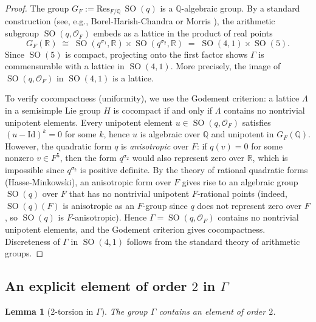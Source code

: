 \documentclass[12pt]{article}
\newtheorem{lemma}[theorem]{Lemma}
\theoremstyle{definition}
\DeclareMathOperator{\SO}{SO}
\begin{document}
\begin{proof}
The group $G_F := \mathrm{Res}_{F/\mathbb{Q}}\,\SO(q)$ is a $\mathbb{Q}$-algebraic group.
By a standard construction (see, e.g., Borel-Harish-Chandra \cite{BHC} or Morris
\cite{Morris2015}), the arithmetic subgroup $\SO(q,\mathcal{O}_F)$ embeds as a lattice
in the product of real points
\[
  G_F(\mathbb{R}) \;\cong\; \SO(q^{\sigma_1},\mathbb{R}) \times \SO(q^{\sigma_2},\mathbb{R})
    \;=\; \SO(4,1) \times \SO(5).
\]
Since $\SO(5)$ is compact, projecting onto the first factor shows $\Gamma$ is commensurable
with a lattice in $\SO(4,1)$.  More precisely, the image of $\SO(q,\mathcal{O}_F)$ in
$\SO(4,1)$ is a lattice.

To verify cocompactness (uniformity), we use the Godement criterion: a lattice
$\Lambda$ in a semisimple Lie group $H$ is cocompact if and only if $\Lambda$ contains no
nontrivial unipotent elements.  Every unipotent element $u \in \SO(q,\mathcal{O}_F)$
satisfies $(u - \mathrm{Id})^k = 0$ for some $k$, hence $u$ is algebraic over $\mathbb{Q}$
and unipotent in $G_F(\mathbb{Q})$.  However, the quadratic form $q$ is \emph{anisotropic}
over $F$: if $q(v) = 0$ for some nonzero $v \in F^5$, then the form $q^{\sigma_2}$ would
also represent zero over $\mathbb{R}$, which is impossible since $q^{\sigma_2}$ is positive
definite.  By the theory of rational quadratic forms (Hasse-Minkowski), an anisotropic form
over $F$ gives rise to an algebraic group $\SO(q)$ over $F$ that has no nontrivial
unipotent $F$-rational points (indeed, $\SO(q)(F)$ is anisotropic as an $F$-group since
$q$ does not represent zero over $F$, so $\SO(q)$ is $F$-anisotropic).  Hence
$\Gamma = \SO(q,\mathcal{O}_F)$ contains no nontrivial unipotent elements, and the
Godement criterion gives cocompactness.  Discreteness of $\Gamma$ in $\SO(4,1)$ follows
from the standard theory of arithmetic groups.
\end{proof}

\subsection{An explicit element of order $2$ in $\Gamma$}

\begin{lemma}[2-torsion in $\Gamma$]\label{lem:torsion}
  The group $\Gamma$ contains an element of order $2$.
\end{lemma}
\end{document}
